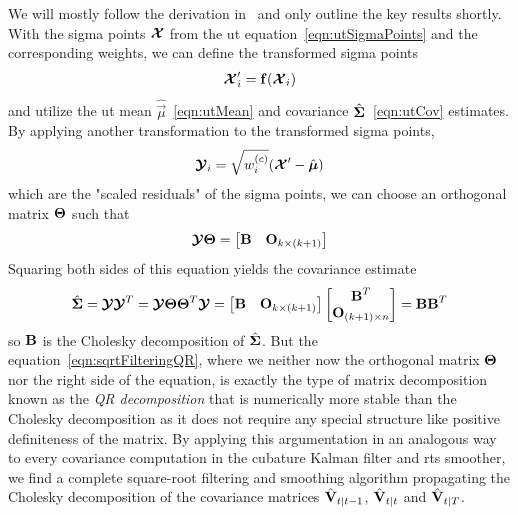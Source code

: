 		We will mostly follow the derivation in~\cite{ruttenSquarerootUnscentedFiltering2013} and only outline the key results shortly. With the sigma points \( \boldsymbol{\mathrm{\mathcal{X}}} \) from the \ac{ut} equation~\eqref{eqn:utSigmaPoints} and the corresponding weights, we can define the transformed sigma points
		\begin{equation*}
			\boldsymbol{\mathrm{\mathcal{X}}}_i' = \boldsymbol{\mathrm{f}}(\boldsymbol{\mathrm{\mathcal{X}}}_i)
		\end{equation*}
		and utilize the \ac{ut} mean \( \hat{\vec{\mu}} \)~\eqref{eqn:utMean} and covariance \( \hat{\boldsymbol{\mathrm{\Sigma}}} \)~\eqref{eqn:utCov} estimates. By applying another transformation to the transformed sigma points,
		\begin{equation*}
			\boldsymbol{\mathrm{\mathcal{Y}}}_i = \sqrt{w_i^{(c)}} (\boldsymbol{\mathrm{\mathcal{X}}}' - \hat{\boldsymbol{\mathrm{\mu}}})
		\end{equation*}
		which are the "scaled residuals" of the sigma points, we can choose an orthogonal matrix \( \boldsymbol{\mathrm{\Theta}} \) such that
		\begin{equation}
			\boldsymbol{\mathrm{\mathcal{Y}}} \boldsymbol{\mathrm{\Theta}} = \begin{bmatrix} \boldsymbol{\mathrm{B}} & \boldsymbol{\mathrm{O}}_{k \times (k + 1)} \end{bmatrix}  \label{eqn:sqrtFilteringQR}
		\end{equation}
		Squaring both sides of this equation yields the covariance estimate
		\begin{equation*}
			\hat{\boldsymbol{\mathrm{\Sigma}}} = \boldsymbol{\mathrm{\mathcal{Y}}} \boldsymbol{\mathrm{\mathcal{Y}}}^T = \boldsymbol{\mathrm{\mathcal{Y}}} \boldsymbol{\mathrm{\Theta}} \boldsymbol{\mathrm{\Theta}}^T \boldsymbol{\mathrm{\mathcal{Y}}} = \begin{bmatrix} \boldsymbol{\mathrm{B}} & \boldsymbol{\mathrm{O}}_{k \times (k + 1)} \end{bmatrix} \begin{bmatrix} \boldsymbol{\mathrm{B}}^T \\ \boldsymbol{\mathrm{O}}_{(k + 1) \times n} \end{bmatrix} = \boldsymbol{\mathrm{B}} \boldsymbol{\mathrm{B}}^T
		\end{equation*}
		so \( \boldsymbol{\mathrm{B}} \) is the Cholesky decomposition of \( \hat{\boldsymbol{\mathrm{\Sigma}}} \). But the equation~\eqref{eqn:sqrtFilteringQR}, where we neither now the orthogonal matrix \( \boldsymbol{\mathrm{\Theta}} \) nor the right side of the equation, is exactly the type of matrix decomposition known as the \emph{QR decomposition} that is numerically more stable than the Cholesky decomposition as it does not require any special structure like positive definiteness of the matrix. By applying this argumentation in an analogous way to every covariance computation in the cubature Kalman filter and \ac{rts} smoother, we find a complete square-root filtering and smoothing algorithm propagating the Cholesky decomposition of the covariance matrices \( \hat{\boldsymbol{\mathrm{V}}}_{t \vert t - 1} \), \( \hat{\boldsymbol{\mathrm{V}}}_{t \vert t} \) and \( \hat{\boldsymbol{\mathrm{V}}}_{t \vert T} \).

